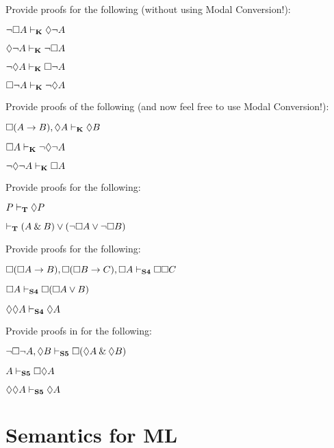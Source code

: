 \problempart
Provide proofs for the following (without using Modal Conversion!):
\begin{earg}
	\item $\neg\Box A\vdash_{\mathbf{K}} \Diamond \neg A$
	\item $\Diamond\neg A\vdash_{\mathbf{K}}\neg \Box A$
	\item $\neg\Diamond A\vdash_{\mathbf{K}}\Box\neg A$
	\item $\Box\neg A\vdash_{\mathbf{K}}\neg\Diamond A$
\end{earg}

\problempart
Provide proofs of the following (and now feel free to use Modal Conversion!):
\begin{earg}
	\item $\Box(A\rightarrow B), \Diamond A \vdash_{\mathbf{K}} \Diamond B$
	\item $\Box A \vdash_{\mathbf{K}} \neg\Diamond\neg A$
	\item $\neg\Diamond\neg A \vdash_{\mathbf{K}} \Box A$
\end{earg}

\problempart
Provide proofs for the following:
\begin{earg}
	\item $P\vdash_{\mathbf{T}}\Diamond P$
	\item $\vdash_{\mathbf{T}} (A\mathbin{\&} B)\vee(\neg \Box A\vee\neg\Box B)$
\end{earg}

\problempart
Provide proofs for the following:
\begin{earg}
	\item $\Box(\Box A\rightarrow B), \Box (\Box B\rightarrow C), \Box A \vdash_{\mathbf{S4}} \Box\Box C$
	\item $\Box A \vdash_{\mathbf{S4}} \Box(\Box A \vee B)$
	\item $\Diamond \Diamond A \vdash_{\mathbf{S4}} \Diamond A$
\end{earg}


\problempart
Provide proofs in \mlSfive{} for the following:
\begin{earg}
	\item $\neg\Box\neg A, \Diamond B\vdash_{\mathbf{S5}} \Box(\Diamond A \mathbin{\&} \Diamond B)$
	\item $A \vdash_{\mathbf{S5}}  \Box\Diamond A$
	\item $\Diamond\Diamond A\vdash_{\mathbf{S5}}  \Diamond A$
\end{earg}


\chapter{Semantics for ML}
\label{Semantics}

